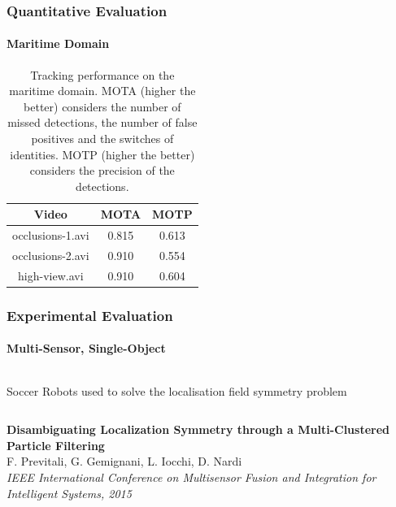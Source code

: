 \begin{frame}
	\frametitle{Quantitative Evaluation}
	\framesubtitle{Maritime Domain}
	
	\large
	
	\begin{table}[!t]
		\renewcommand{\arraystretch}{1.3}
		\caption{\large Tracking performance on the maritime domain. MOTA (higher the better) considers
				 the number of missed detections, the number of false positives and the switches of
				 identities. MOTP (higher the better) considers the precision of the detections.}
		\centering
		\vspace{0.2cm}
		
		\begin{tabular}{ccc}
			\hline
			\hline
			\textbf{Video} & \textbf{MOTA} & \textbf{MOTP} \\
			\hline
			occlusions-1.avi & 0.815 & 0.613 \\
			\hline
			occlusions-2.avi & 0.910 & 0.554 \\
			\hline
			high-view.avi & 0.910 & 0.604 \\
			\hline
		\hline
		\end{tabular}
	\end{table}
\end{frame}

\begin{frame}
	\frametitle{Experimental Evaluation}
	\framesubtitle{Multi-Sensor, Single-Object}
	
	\large
	
	\vspace{-0.3cm}
	
	\begin{columns}[t]
		{
			
			\begin{block}{Soccer Robots}
				used to solve the localisation field symmetry problem
			\end{block}
			
		}
	\end{columns}
	
	\vspace{0.15cm}
	
	\begin{center}
	\end{center}
	
	\tiny
	
	\textbf{Disambiguating Localization Symmetry through a Multi-Clustered Particle Filtering} \\
	F. Previtali, G. Gemignani, L. Iocchi, D. Nardi \\
	\emph{IEEE International Conference on Multisensor Fusion and Integration for Intelligent Systems,
	2015} \\
\end{frame}

